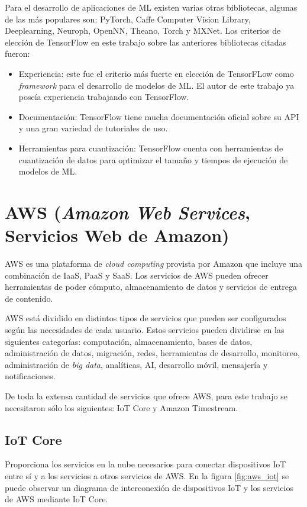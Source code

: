 Para el desarrollo de aplicaciones de ML existen varias otras bibliotecas, algunas de las más populares son: PyTorch, Caffe Computer Vision Library, Deeplearning, Neuroph, OpenNN, Theano, Torch y MXNet. Los criterios de elección de TensorFlow en este trabajo sobre las anteriores bibliotecas citadas fueron:
\begin{itemize}
	\item Experiencia: este fue el criterio más fuerte en elección de TensorFLow como \textit{framework} para el desarrollo de modelos de ML. El autor de este trabajo ya poseía experiencia trabajando con TensorFlow.
	\item Documentación: TensorFlow tiene mucha documentación oficial sobre su API y una gran variedad de tutoriales de uso.
	\item Herramientas para cuantización: TensorFlow cuenta con herramientas de cuantización de datos para optimizar el tamaño y tiempos de ejecución de modelos de ML.
\end{itemize}

\section{AWS (\textit{Amazon Web Services}, Servicios Web de Amazon)}
AWS es una plataforma de \textit{cloud computing} provista por Amazon que incluye una combinación de IaaS, PaaS y SaaS. Los servicios de AWS pueden ofrecer herramientas de poder cómputo, almacenamiento de datos y servicios de entrega de contenido.

AWS está dividido en distintos tipos de servicios que pueden ser configurados según las necesidades de cada usuario. Estos servicios pueden dividirse en las siguientes categorías: computación, almacenamiento, bases de datos, administración de datos, migración, redes, herramientas de desarrollo, monitoreo, administración de \textit{big data}, analíticas, AI, desarrollo móvil, mensajería y notificaciones.

De toda la extensa cantidad de servicios que ofrece AWS, para este trabajo se necesitaron sólo los siguientes: IoT Core y Amazon Timestream.

\subsection{IoT Core}
Proporciona los servicios en la nube necesarios para conectar dispositivos IoT entre sí y a los servicios a otros servicios de AWS. En la figura \ref{fig:aws_iot} se puede observar un diagrama de interconexión de dispositivos IoT y los servicios de AWS mediante IoT Core.

